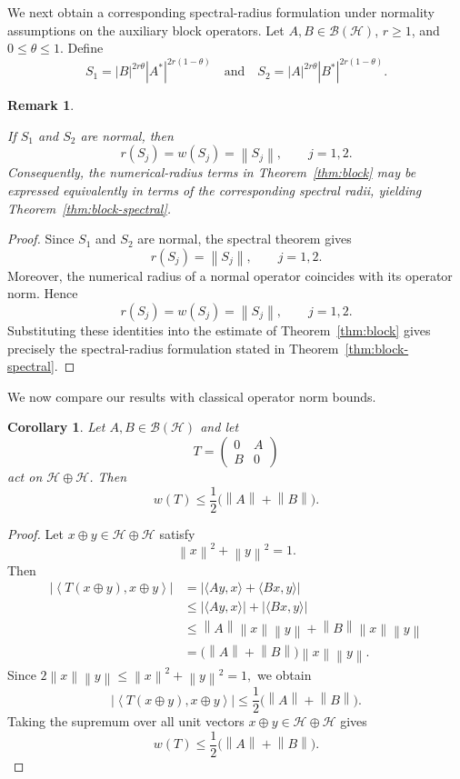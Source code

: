 \documentclass[final,1p,times]{elsarticle}
\newtheorem{rem}[thm]{Remark}
\newtheorem{cor}[thm]{Corollary}
\newcommand{\BH}{\mathcal{B}(\mathcal{H})}
\newcommand{\norm}[1]{\left\lVert #1 \right\rVert}
\begin{document}
\medskip

We next obtain a corresponding spectral-radius formulation under
normality assumptions on the auxiliary block operators. Let $A,B\in\BH$, $r\geq1$, and $0\leq\theta\leq1$. Define
\[
S_1
=
|B|^{2r\theta}|A^*|^{2r(1-\theta)}
\quad\text{and}\quad
S_2
=
|A|^{2r\theta}|B^*|^{2r(1-\theta)}.
\]

\begin{rem}\label{prop:block-normality}

If $S_1$ and $S_2$ are normal, then
\[
r(S_j)=w(S_j)=\norm{S_j},
\qquad j=1,2.
\]
Consequently, the numerical-radius terms in
Theorem~\ref{thm:block} may be expressed equivalently in terms of
the corresponding spectral radii, yielding Theorem~\ref{thm:block-spectral}.
\end{rem}

\begin{proof}
Since $S_1$ and $S_2$ are normal, the spectral theorem gives
\[
r(S_j)=\norm{S_j},
\qquad j=1,2.
\]
Moreover, the numerical radius of a normal operator coincides with
its operator norm. Hence
\[
r(S_j)=w(S_j)=\norm{S_j},
\qquad j=1,2.
\]
Substituting these identities into the estimate of
Theorem~\ref{thm:block} gives precisely the spectral-radius
formulation stated in Theorem~\ref{thm:block-spectral}.
\end{proof}

\medskip

We now compare our results with classical operator norm bounds.

\begin{cor}\label{cor:block-classical}
Let $A,B\in\BH$ and let
\[
T=
\begin{pmatrix}
0 & A\\
B & 0
\end{pmatrix}
\]
act on $\mathcal H\oplus\mathcal H$. Then
\[
w(T)
\leq
\frac12\bigl(\norm{A}+\norm{B}\bigr).
\]
\end{cor}

\begin{proof}
Let $x\oplus y\in\mathcal H\oplus\mathcal H$ satisfy
\[
\norm{x}^2+\norm{y}^2=1.
\]
Then
\[
\begin{aligned}
\left|
\left\langle
T(x\oplus y),x\oplus y
\right\rangle
\right|
&=
\left|
\langle Ay,x\rangle+\langle Bx,y\rangle
\right|
\\
&\leq
|\langle Ay,x\rangle|
+
|\langle Bx,y\rangle|
\\
&\leq
\norm{A}\norm{x}\norm{y}
+
\norm{B}\norm{x}\norm{y}
\\
&=
\bigl(\norm{A}+\norm{B}\bigr)
\norm{x}\norm{y}.
\end{aligned}
\]
Since $2\norm{x}\norm{y}
\leq
\norm{x}^2+\norm{y}^2
=1,$
we obtain
\[
\left|
\left\langle
T(x\oplus y),x\oplus y
\right\rangle
\right|
\leq
\frac12
\bigl(\norm{A}+\norm{B}\bigr).
\]
Taking the supremum over all unit vectors
$x\oplus y\in\mathcal H\oplus\mathcal H$ gives
\[
w(T)
\leq
\frac12
\bigl(\norm{A}+\norm{B}\bigr).
\]
\end{proof}
\end{document}
